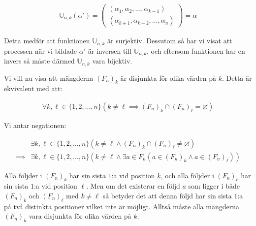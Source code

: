 \documentclass{tufte-handout}
\begin{document}
\begin{ans}
    \vspace{-4mm}
    
    \begin{align*}
        \mathbb{U}_{n, k}(\alpha') = \begin{pmatrix} (\alpha_1, \alpha_2, \ldots, \alpha_{k-1}) \\ (\alpha_{k+1}, \alpha_{k+2}, \ldots, \alpha_{n}) \end{pmatrix} = \alpha
    \end{align*}

    Detta medför att funktionen $\mathbb{U}_{n ,k}$ är surjektiv. Dessutom så har vi visat att processen när vi bildade $\alpha'$ är inversen till $\mathbb{U}_{n, k}$, och eftersom funktionen har en invers så måste därmed $\mathbb{U}_{n, k}$ vara bijektiv.

    \vspace{3mm}

    Vi vill nu visa att mängderna $(F_n)_k$ är disjunkta för olika värden på $k$. Detta är ekvivalent med att:

    \vspace{-4mm}

    \begin{align*}
        \forall k, \ell \in \{1, 2, \ldots, n\}(k \neq \ell \implies (F_n)_k \cap (F_n)_\ell = \varnothing)
    \end{align*}

    Vi antar negationen:

    \vspace{-4mm}

    \begin{align*}
        &\exists k, \ell \in \{1, 2, \ldots, n\}(k \neq \ell \land (F_n)_k \cap (F_n)_\ell \neq \varnothing) \\
        \implies &\exists k, \ell \in \{1, 2, \ldots, n\}(k \neq \ell \land \exists a \in F_n (a \in (F_n)_k \land a \in (F_n)_\ell))
    \end{align*}

    Alla följder i $(F_n)_k$ har sin sista $1$:a vid position $k$, och alla följder i $(F_n)_\ell$ har sin sista $1$:a vid position $\ell$. Men om det existerar en följd $a$ som ligger i både $(F_n)_k$ och $(F_n)_\ell$ med $k \neq \ell$ så betyder det att denna följd har sin sista $1$:a på två distinkta positioner vilket inte är möjligt. Alltså måste alla mängderna $(F_n)_k$ vara disjunkta för olika värden på $k$.

    \vspace{3mm}


\end{ans}
\end{document}

